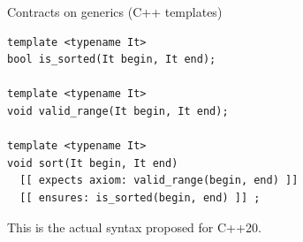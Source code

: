 \documentclass[11pt]{beamer}
\begin{document}


%

\begin{frame}[fragile=singleslide]{Contracts on generics (C++ templates)}
\begin{lstlisting}
template <typename It>
bool is_sorted(It begin, It end);

template <typename It>
void valid_range(It begin, It end);

template <typename It>
void sort(It begin, It end)
  [[ expects axiom: valid_range(begin, end) ]]
  [[ ensures: is_sorted(begin, end) ]] ;
\end{lstlisting}
\pause This is the actual syntax proposed for C++20.
\end{frame}
\end{document}

